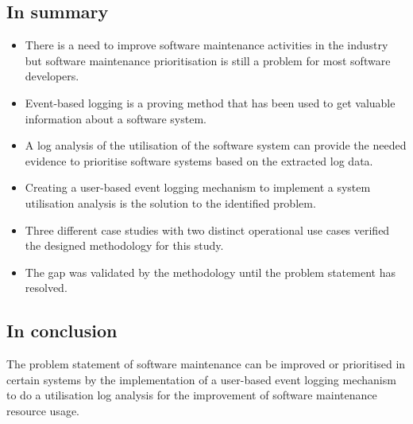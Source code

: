 \subsection{In summary}
\begin{itemize}
	\item There is a need to improve software maintenance activities in the industry but software maintenance prioritisation is still a problem for most software developers.
	\item Event-based logging is a proving method that has been used to get valuable information about a software system.
	\item A log analysis of the utilisation of the software system can provide the needed evidence to prioritise software systems based on the extracted log data.
	\item Creating a user-based event logging mechanism to implement a system utilisation analysis is the solution to the identified problem.
	\item Three different case studies with two distinct operational use cases verified the designed methodology for this study.
	\item The gap was validated by the methodology until the problem statement has resolved.
\end{itemize}

\subsection{In conclusion}
The problem statement of software maintenance can be improved or prioritised in certain systems by the implementation of a user-based event logging mechanism to do a utilisation log analysis for the improvement of software maintenance resource usage.